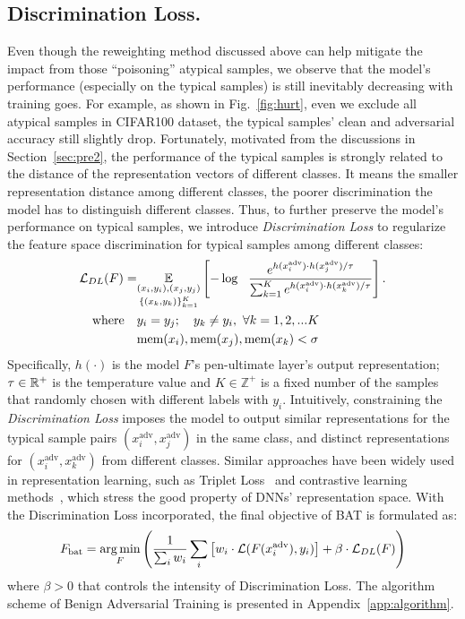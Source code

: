 \subsection{Discrimination Loss.}
Even though the reweighting method discussed above can help mitigate the impact from those ``poisoning'' atypical samples, we observe that the model's performance (especially on the typical samples) is still inevitably decreasing with training goes. For example, as shown in Fig.~\ref{fig:hurt}, even we exclude all atypical samples in CIFAR100 dataset, the typical samples' clean and adversarial accuracy still slightly drop. Fortunately, motivated from the discussions in Section~\ref{sec:pre2}, the performance of the typical samples is strongly related to the distance of the representation vectors of different classes. It means the smaller representation distance among different classes, the poorer discrimination the model has to distinguish different classes. 
Thus, to further preserve the model's performance on typical samples, we introduce \textit{Discrimination Loss} to regularize the feature space discrimination for typical samples among different classes:
\begin{align}
\label{eq:dl}
\begin{split}
\mathcal{L}_{DL} (F) = &
\underset{{\{(x_k, y_k)\}^K_{k=1}}}{
\underset{(x_i,y_i), (x_j, y_j)} {\mathbb{E}}  }
\left[- \log ~~\frac{e^{h(x_i^\text{adv}) \cdot h(x_j^\text{adv}) / \tau}}{ \sum_{k=1}^K  e^{h(x_i^\text{adv}) \cdot h(x_k^\text{adv}) / \tau}} \right].\\
\text{where~~~}  & y_i= y_j; \text{~~~} y_k\neq y_i, \text{~}\forall k=1,2,...K \\
&\text{mem}(x_i), \text{mem}(x_j), \text{mem}(x_k) < \sigma\\
\end{split}
\end{align}
Specifically, $h(\cdot)$ is the model $F$'s pen-ultimate layer's output representation; $\tau\in\mathbb{R}^+$ is the temperature value and $K\in \mathbb{Z}^+$ is a fixed number of the samples that randomly chosen with different labels with $y_i$\footnotemark.
Intuitively, constraining the \textit{Discrimination Loss} imposes the model to output similar representations for the typical sample pairs $(x_i^\text{adv}, x_j^\text{adv})$ in the same class, and distinct representations for $(x_i^\text{adv}, x_k^\text{adv})$ from different classes. Similar approaches have been widely used in
representation learning, such as Triplet Loss~\cite{schroff2015facenet} and contrastive learning methods~\cite{chen2020simple}, which stress the good property of DNNs' representation space.
With the Discrimination Loss incorporated, the final objective of BAT is formulated as:
\begin{align}
    F_\text{bat} =\operatorname*{arg\,min}_F  \left(\frac{1}{\sum_i w_i }\sum_i \left[w_i \cdot \mathcal{L}(F(x_i^\text{adv}), y_i)\right] + \beta\cdot\mathcal{L}_{DL}(F) \right)
\end{align}
where $\beta>0$ that controls the intensity of Discrimination Loss.
The algorithm scheme of Benign Adversarial Training is presented in Appendix~\ref{app:algorithm}.

